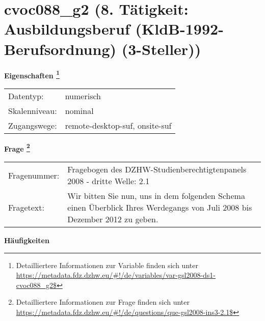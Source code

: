 
    \setcounter{footnote}{0}

    \vspace*{-1.8cm}
	\section{cvoc088\_g2 (8. Tätigkeit: Ausbildungsberuf (KldB-1992-Berufsordnung) (3-Steller))}
	\label{section:cvoc088_g2}



    \vspace*{0.5cm}
    \noindent\textbf{Eigenschaften
	\footnote{Detailliertere Informationen zur Variable finden sich unter
		\url{https://metadata.fdz.dzhw.eu/\#!/de/variables/var-gsl2008-ds1-cvoc088_g2$}}}\\
	\begin{tabularx}{\hsize}{@{}lX}
	Datentyp: & numerisch \\
	Skalenniveau: & nominal \\
	Zugangswege: &
	  remote-desktop-suf, 
	  onsite-suf
 \\
    \end{tabularx}



				\vspace*{0.5cm}
                \noindent\textbf{Frage
	                \footnote{Detailliertere Informationen zur Frage finden sich unter
		              \url{https://metadata.fdz.dzhw.eu/\#!/de/questions/que-gsl2008-ins3-2.1$}}}\\
				\begin{tabularx}{\hsize}{@{}lX}
					Fragenummer: &
					  Fragebogen des DZHW-Studienberechtigtenpanels 2008 - dritte Welle:
					  2.1
 \\
					Fragetext: & Wir bitten Sie nun, uns in dem folgenden Schema einen Überblick Ihres Werdegangs von Juli 2008 bis Dezember 2012 zu geben. \\
				\end{tabularx}





        		\vspace*{0.5cm}
                \noindent\textbf{Häufigkeiten}

